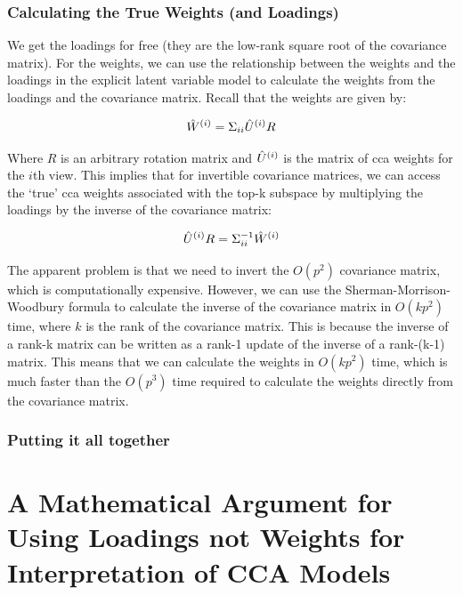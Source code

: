 \subsubsection{Calculating the True Weights (and Loadings)}
We get the loadings for free (they are the low-rank square root of the covariance matrix).
For the weights, we can use the relationship between the weights and the loadings in the explicit latent variable model to calculate the weights from the loadings and the covariance matrix.
Recall that the weights are given by:

\begin{align}
    \hat{W}^{(i)} = \Sigma_{ii} \hat{U}^{(i)} R
\end{align}

Where $R$ is an arbitrary rotation matrix and $\hat{U}^{(i)}$ is the matrix of \acrshort{cca} weights for the $i$th view.
This implies that for invertible covariance matrices, we can access the `true' \acrshort{cca} weights associated with the top-k subspace by multiplying the \gls{loadings} by the inverse of the covariance matrix:

\begin{align}
    \hat{U}^{(i)}R = \Sigma_{ii}^{-1} \hat{W}^{(i)}
\end{align}

The apparent problem is that we need to invert the \(O(p^2)\) covariance matrix, which is computationally expensive.
However, we can use the Sherman-Morrison-Woodbury formula to calculate the inverse of the covariance matrix in \(O(kp^2)\) time, where \(k\) is the rank of the covariance matrix.
This is because the inverse of a rank-k matrix can be written as a rank-1 update of the inverse of a rank-(k-1) matrix.
This means that we can calculate the weights in \(O(kp^2)\) time, which is much faster than the \(O(p^3)\) time required to calculate the weights directly from the covariance matrix.



\subsubsection{Putting it all together}



\section{A Mathematical Argument for Using Loadings not Weights for Interpretation of CCA Models}\label{sec:an-argument-for-the-use-of-loadings}

